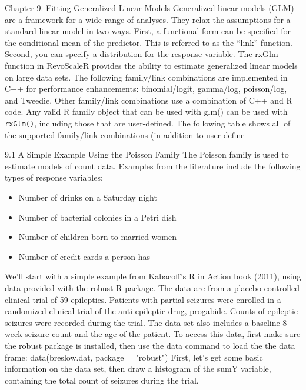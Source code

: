 Chapter 9.
Fitting Generalized Linear
Models
Generalized linear models (GLM) are a framework for a wide range of analyses. They relax the
assumptions for a standard linear model in two ways. First, a functional form can be specified
for the conditional mean of the predictor. This is referred to as the “link” function. Second,
you can specify a distribution for the response variable. The rxGlm function in RevoScaleR
provides the ability to estimate generalized linear models on large data sets.
The following family/link combinations are implemented in C++ for performance
enhancements: binomial/logit, gamma/log, poisson/log, and Tweedie. Other family/link
combinations use a combination of C++ and R code. Any valid R family object that can be used
with glm() can be used with \texttt{rxGlm()}, including those that are user-defined. The following table
shows all of the supported family/link combinations (in addition to user-define

9.1 A Simple Example Using the Poisson Family
The Poisson family is used to estimate models of count data. Examples from the literature
include the following types of response variables:

\begin{itemize}
\item Number of drinks on a Saturday night
\item Number of bacterial colonies in a Petri dish
\item Number of children born to married women
\item Number of credit cards a person has
\end{itemize}
We’ll start with a simple example from Kabacoff’s R in Action book (2011), using data provided
with the robust R package. The data are from a placebo-controlled clinical trial of 59 epileptics.
Patients with partial seizures were enrolled in a randomized clinical trial of the anti-epileptic
drug, progabide. Counts of epileptic seizures were recorded during the trial. The data set also
includes a baseline 8-week seizure count and the age of the patient.
To access this data, first make sure the robust package is installed, then use the data command
to load the the data frame:
data(breslow.dat, package = "robust")
First, let’s get some basic information on the data set, then draw a histogram of the sumY
variable, containing the total count of seizures during the trial.

